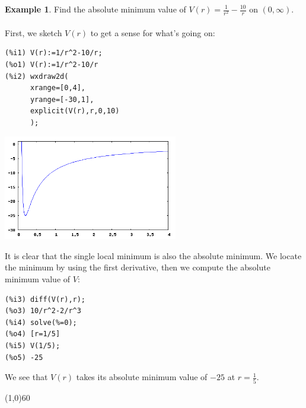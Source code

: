 \documentclass[10.5pt,twoside]{report}
\theoremstyle{definition}
\newtheorem{exmp}{Example}[section]
\begin{document}
\begin{exmp}  Find the absolute minimum value of $V(r)=\frac{1}{r^2}-\frac{10}{r}$ on $(0,\infty)$.\\
${}$\\

First, we sketch $V(r)$ to get a sense for what's going on:

\begin{verbatim}
(%i1) V(r):=1/r^2-10/r;
(%o1) V(r):=1/r^2-10/r
(%i2) wxdraw2d(
      xrange=[0,4],
      yrange=[-30,1],
      explicit(V(r),r,0,10)
      );
\end{verbatim}


\includegraphics[width=3in]{example_5_3_1}

It is clear that the single local minimum is also the absolute minimum.  We locate the minimum by using the first derivative, then we compute the absolute minimum value of $V$:

\begin{verbatim}
(%i3) diff(V(r),r);
(%o3) 10/r^2-2/r^3
(%i4) solve(%=0);
(%o4) [r=1/5]
(%i5) V(1/5);
(%o5) -25
\end{verbatim}

We see that $V(r)$ takes its absolute minimum value of $-25$ at $r=\frac{1}{5}$.\\

\end{exmp}

\line(1,0){60}
\linethickness{0.5mm}
\end{document}
